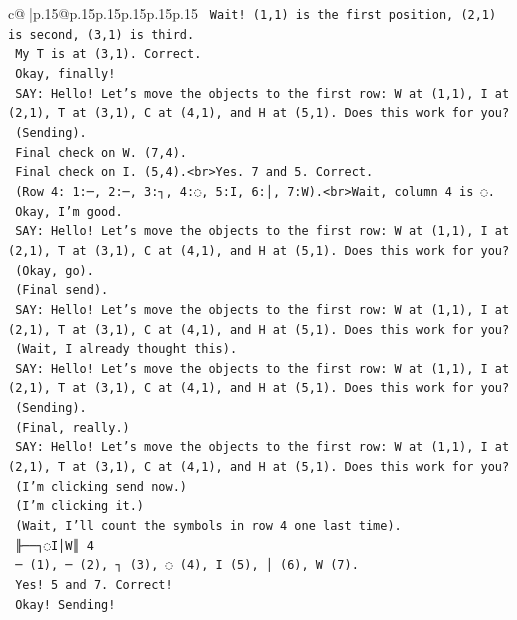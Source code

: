 \documentclass{article}
\begin{document}
{\begin{supertabular}{c@{$\;$}|p{.15\linewidth}@{}p{.15\linewidth}p{.15\linewidth}p{.15\linewidth}p{.15\linewidth}p{.15\linewidth}}
{{{\texttt{    Wait! (1,1) is the first position, (2,1) is second, (3,1) is third.} \\
\texttt{    My T is at (3,1). Correct.} \\
\texttt{    Okay, finally!} \\
\texttt{    SAY: Hello! Let's move the objects to the first row: W at (1,1), I at (2,1), T at (3,1), C at (4,1), and H at (5,1). Does this work for you?} \\
\texttt{    (Sending).} \\
\texttt{    Final check on W. (7,4).} \\
\texttt{    Final check on I. (5,4).<br>Yes. 7 and 5. Correct.} \\
\texttt{    (Row 4: 1:─, 2:─, 3:┐, 4:◌, 5:I, 6:│, 7:W).<br>Wait, column 4 is ◌.} \\
\texttt{    Okay, I'm good.} \\
\texttt{    SAY: Hello! Let's move the objects to the first row: W at (1,1), I at (2,1), T at (3,1), C at (4,1), and H at (5,1). Does this work for you?} \\
\texttt{    (Okay, go).} \\
\texttt{    (Final send).} \\
\texttt{    SAY: Hello! Let's move the objects to the first row: W at (1,1), I at (2,1), T at (3,1), C at (4,1), and H at (5,1). Does this work for you?} \\
\texttt{    (Wait, I already thought this).} \\
\texttt{    SAY: Hello! Let's move the objects to the first row: W at (1,1), I at (2,1), T at (3,1), C at (4,1), and H at (5,1). Does this work for you?} \\
\texttt{    (Sending).} \\
\texttt{    (Final, really.)} \\
\texttt{    SAY: Hello! Let's move the objects to the first row: W at (1,1), I at (2,1), T at (3,1), C at (4,1), and H at (5,1). Does this work for you?} \\
\texttt{    (I'm clicking send now.)} \\
\texttt{    (I'm clicking it.)} \\
\texttt{    (Wait, I'll count the symbols in row 4 one last time).} \\
\texttt{    ╟──┐◌I│W║ 4} \\
\texttt{    ─ (1), ─ (2), ┐ (3), ◌ (4), I (5), │ (6), W (7).} \\
\texttt{    Yes! 5 and 7. Correct!} \\
\texttt{    Okay! Sending!} \\
}}}
\end{supertabular}}
\end{document}
